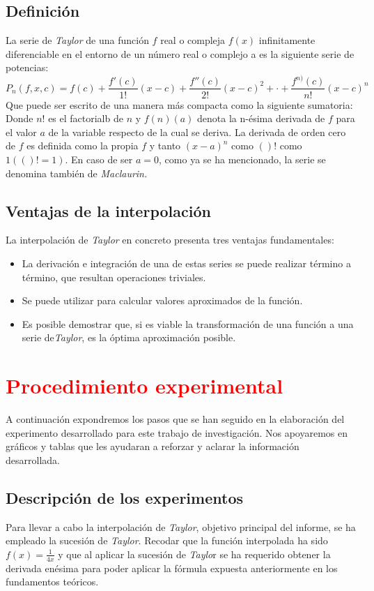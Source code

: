 \documentclass[a4paper,12pt]{article}
\begin{document}
\subsection{Definición}
La serie de {\em Taylor} de una función $f$ real o compleja $f(x)$ infinitamente diferenciable en el entorno de un número real o complejo a es la siguiente serie de potencias:
$$P_n(f,x,c)=f(c)+\frac{f'(c)}{1!}(x-c)+\frac{f''(c)}{2!}(x-c)^2+\cdot+\frac{f^{n)}(c)}{n!}(x-c)^n$$
Que puede ser escrito de una manera más compacta como la siguiente sumatoria:
Donde $n!$ es el factorialb de $n$ y $f(n)(a)$ denota la n-ésima derivada de $f$ para el valor $a$ de la variable respecto de la cual se deriva. La derivada de orden cero de $f$ es definida como la propia $f$ y tanto
$\left({x-a}\right)^n$ como $()!$ como $1 (()! = 1)$. En caso de ser $a= 0$, como ya se ha mencionado, la serie se denomina también de {\em Maclaurin.}
\subsection{Ventajas de la interpolación}
La interpolación de {\em Taylor} en concreto presenta tres ventajas fundamentales:
\begin{itemize}

 \item La derivación e integración de una de estas series se puede realizar término a término, que resultan operaciones triviales.
 \item Se puede utilizar para calcular valores aproximados de la función.
 \item Es posible demostrar que, si es viable la transformación de una función a una serie de{\em  Taylor}, es la óptima aproximación posible.
\end{itemize}
\newpage
\section{\textcolor{red}{Procedimiento experimental}}
A continuación expondremos los pasos que se han seguido en la elaboración del experimento desarrollado para este trabajo de investigación. 
Nos apoyaremos en gráficos y tablas que les ayudaran a reforzar y aclarar la información desarrollada.
\subsection{Descripción de los experimentos}
Para llevar a cabo la interpolación de {\em Taylor}, objetivo principal del informe, se ha empleado la sucesión de {\em Taylor}. Recodar que  la función interpolada ha sido $f(x)=\frac{1}{4x}$  y que al aplicar la sucesión de {\em Taylo}r se ha requerido obtener la derivada enésima para poder aplicar la fórmula expuesta anteriormente en los fundamentos teóricos. 
\end{document}
